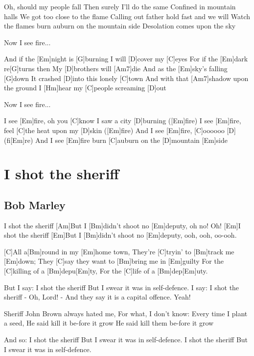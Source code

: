\documentclass[a4paper,12pt]{article}
\begin{document}
\begin{multicols}{2}
\begin{guitar}
Oh, should my people fall
Then surely I'll do the same
Confined in mountain halls
We got too close to the flame  
Calling out father hold fast and we will
Watch the flames burn 
auburn on the mountain side
Desolation comes upon the sky


   
Now I see fire...



And if the [Em]night is [G]burning
I will [D]cover my [C]eyes
For if the [Em]dark re[G]turns then
My [D]brothers will [Am7]die
And as the [Em]sky's falling [G]down
It crashed [D]into this lonely [C]town
And with that [Am7]shadow upon the ground
I [Hm]hear my [C]people screaming [D]out

        

Now I see fire...



I see [Em]fire, 
oh you [C]know I saw a city [D]burning ([Em]fire)
I see [Em]fire, 
feel [C]the heat upon my [D]skin ([Em]fire)
And I see [Em]fire, 
[C]oooooo [D](fi[Em]re)
And I see [Em]fire burn 
[C]auburn on the [D]mountain [Em]side

\end{guitar}
\section{I shot the sheriff}
\subsection*{Bob Marley}
\begin{guitar}
[Em]I shot the sheriff
[Am]But I [Bm]didn't shoot 
no [Em]deputy, oh no! Oh!
[Em]I shot the sheriff
[Em]But I [Bm]didn't shoot 
no [Em]deputy, ooh, ooh, oo-ooh.


[C]All a[Bm]round in my [Em]home town,
They're [C]tryin' to [Bm]track me [Em]down;
They [C]say they want to [Bm]bring me in [Em]guilty
For the [C]killing of a [Bm]depu[Em]ty,
For the [C]life of a [Bm]dep[Em]uty.


But I say:
I shot the sheriff
But I swear it was in self-defence. 
I say: I shot the sheriff - Oh, Lord! -
And they say it is a capital offence. Yeah!


Sheriff John Brown always hated me,
For what, I don't know:
 Every time I plant a seed, 
He said kill it be-fore it grow
He said kill them be-fore it grow 


And so:
I shot the sheriff
But I swear it was in self-defence.
I shot the sheriff
But I swear it was in self-defence. 



\end{guitar}
\end{multicols}
\end{document}
